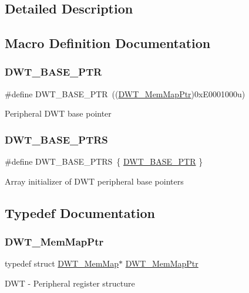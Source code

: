 \subsection{Detailed Description}


\subsection{Macro Definition Documentation}
\mbox{\label{group___d_w_t___peripheral_ga3b46dfb2ea7946c6938028d879c82cb1}} 
\subsubsection{\texorpdfstring{D\+W\+T\+\_\+\+B\+A\+S\+E\+\_\+\+P\+TR}{DWT\_BASE\_PTR}}
{\footnotesize\ttfamily \#define D\+W\+T\+\_\+\+B\+A\+S\+E\+\_\+\+P\+TR~((\hyperlink{group___d_w_t___peripheral_ga8a09a1b28d871c18ae8c69f67af6d573}{D\+W\+T\+\_\+\+Mem\+Map\+Ptr})0x\+E0001000u)}

Peripheral D\+WT base pointer \mbox{\label{group___d_w_t___peripheral_ga606d55285f2df3c4bb43272ec842b475}} 
\subsubsection{\texorpdfstring{D\+W\+T\+\_\+\+B\+A\+S\+E\+\_\+\+P\+T\+RS}{DWT\_BASE\_PTRS}}
{\footnotesize\ttfamily \#define D\+W\+T\+\_\+\+B\+A\+S\+E\+\_\+\+P\+T\+RS~\{ \hyperlink{group___d_w_t___peripheral_ga3b46dfb2ea7946c6938028d879c82cb1}{D\+W\+T\+\_\+\+B\+A\+S\+E\+\_\+\+P\+TR} \}}

Array initializer of D\+WT peripheral base pointers 

\subsection{Typedef Documentation}
\mbox{\label{group___d_w_t___peripheral_ga8a09a1b28d871c18ae8c69f67af6d573}} 
\subsubsection{\texorpdfstring{D\+W\+T\+\_\+\+Mem\+Map\+Ptr}{DWT\_MemMapPtr}}
{\footnotesize\ttfamily typedef struct \hyperlink{struct_d_w_t___mem_map}{D\+W\+T\+\_\+\+Mem\+Map}$\ast$ \hyperlink{group___d_w_t___peripheral_ga8a09a1b28d871c18ae8c69f67af6d573}{D\+W\+T\+\_\+\+Mem\+Map\+Ptr}}

D\+WT -\/ Peripheral register structure 